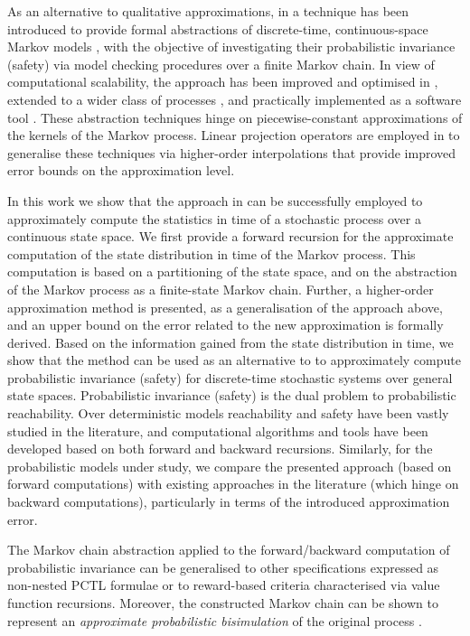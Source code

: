 \documentclass{LMCS}
\begin{document}
As an alternative to qualitative approximations, 
in \cite{APKL10} a technique has been introduced to provide formal abstractions of discrete-time, continuous-space Markov models \cite{APLS08}, 
with the objective of investigating their probabilistic invariance (safety) via model checking procedures over a finite Markov chain.
In view of computational scalability, the approach has been improved and optimised in \cite{SA11,SA13}, 
extended to a wider class of processes \cite{SA12,SATAC12}, and practically implemented as a software tool \cite{FAUST15}.  
These abstraction techniques hinge on piecewise-constant approximations of the kernels of the Markov process. 
Linear projection operators are employed in \cite{SAH12} to generalise these techniques via higher-order interpolations that provide improved error bounds on the approximation level.

In this work we show that the approach in \cite{APKL10,SA13} can be successfully employed to approximately compute the statistics in time of a stochastic process over a continuous state space. 
We first provide a forward recursion for the approximate computation of the state distribution in time of the Markov process. 
This computation is based on a partitioning of the state space, 
and on the abstraction of the Markov process as a finite-state Markov chain. 
Further, a higher-order approximation method is presented, as a generalisation of the approach above, 
and an upper bound on the error related to the new approximation is formally derived.
Based on the information gained from the state distribution in time, 
we show that the method can be used as an alternative to \cite{APKL10,SAH12,SA12,SA13} to approximately compute 
probabilistic invariance (safety) for discrete-time stochastic systems over general state spaces.
Probabilistic invariance (safety) is the dual problem to probabilistic reachability. 
Over deterministic models reachability and safety have been vastly studied in the literature, 
and computational algorithms and tools have been developed based on both forward and backward recursions.
Similarly, for the probabilistic models under study, 
we compare the presented approach (based on forward computations) with existing approaches in the literature \cite{APKL10,SAH12,SA12,SA13} (which hinge on backward computations), 
particularly in terms of the introduced approximation error.

The Markov chain abstraction applied to the forward/backward computation of probabilistic invariance can be generalised to other specifications expressed as non-nested PCTL formulae or to reward-based criteria characterised via value function recursions. 
Moreover, the constructed Markov chain can be shown to represent an \emph{approximate probabilistic bisimulation} of the original process \cite{A12,TA13,AKNP14}.
\end{document}
